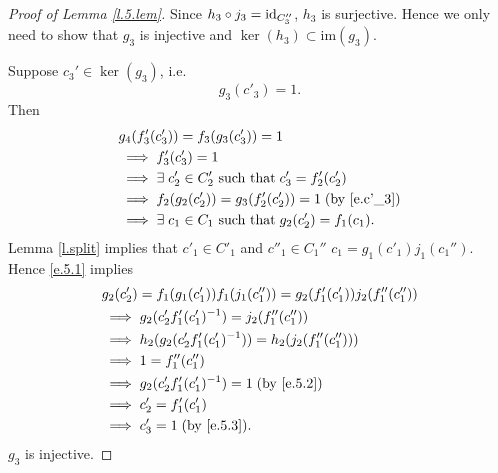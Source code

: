 \documentclass[11pt,twoside]{article}
\begin{document}
\begin{proof}[Proof of Lemma \ref{l.5.lem}]
Since \(h_3\circ j_3 = \textup{id}_{C_3''}\), \(h_3\) is surjective. Hence we only need to show that \(g_3\) is injective and \(\ker(h_3)\subset \text{im}(g_3)\). 

Suppose $c_3'\in \ker(g_3)$, i.e.
\begin{equation}\label{e.c'_3}
g_3(c'_3)=1.
\end{equation}
Then
\begin{align}
& g_4(f_3'(c'_3))= f_3(g_3(c_3')) = 1\\
& \implies f'_3(c'_3)=1\\
&\implies \exists\; c'_2 \in C'_2 \text{ such that\;} c'_3 = f'_2(c'_2) \label{e.5.3}\\
& \implies f_2(g_2(c'_2))=g_3(f'_2(c'_2)) = 1\;(\text{by }\eqref{e.c'_3})\\
& \implies \exists\; c_1 \in C_1 \text{ such that\;} g_2(c'_2)=f_1(c_1). \label{e.5.1}
\end{align}
Lemma \ref{l.split} implies that \te \(c'_1\in C'_1\) and \(c''_1\in C_1''\) \st \(c_1=g_1(c'_1)j_1(c_1'')\). Hence \eqref{e.5.1} implies
\begin{align}
& g_2(c_2')= f_1(g_1(c'_1))f_1(j_1(c_1'')) = g_2(f_1'(c_1'))j_2(f_1''(c_1''))\\
& \implies g_2(c_2'f_1'(c_1')^{-1}) = j_2(f_1''(c_1'')) \label{e.5.2}\\
& \implies h_2(g_2(c_2'f_1'(c_1')^{-1})) = h_2(j_2(f_1''(c_1''))) \\
& \implies 1= f_1''(c_1'') \\
& \implies g_2(c_2'f_1'(c_1')^{-1}) = 1\; (\text{by } \eqref{e.5.2}) \\
& \implies c_2' = f_1'(c_1')\\
& \implies c_3' = 1\; (\text{by } \eqref{e.5.3}).
\end{align}
\tf \(g_3\) is injective.


\end{proof}
\end{document}
